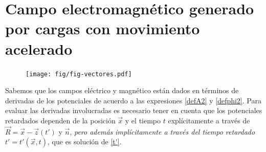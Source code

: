 \section{Campo electromagnético generado por cargas con movimiento acelerado}
\begin{figure}[ht]
\centerline{\texttt{[image: fig/fig-vectores.pdf]}}
\label{R7}
\end{figure}
Sabemos que los campos eléctrico y magnético están dados en términos de derivadas de los potenciales de acuerdo a las expresiones \eqref{defA2} y \eqref{defphi2}. Para evaluar las derivadas involucradas es necesario tener en cuenta que los potenciales retardados dependen de la posición $\vec{x}$ y el tiempo $t$ explícitamente a través de $\vec{R}=\vec{x}-\vec{z}(t')$ y $\vec{n}$, \textit{pero además implícitamente a través del tiempo retardado} $t'=t'(\vec{x},t)$, que es solución de \eqref{t'}.

